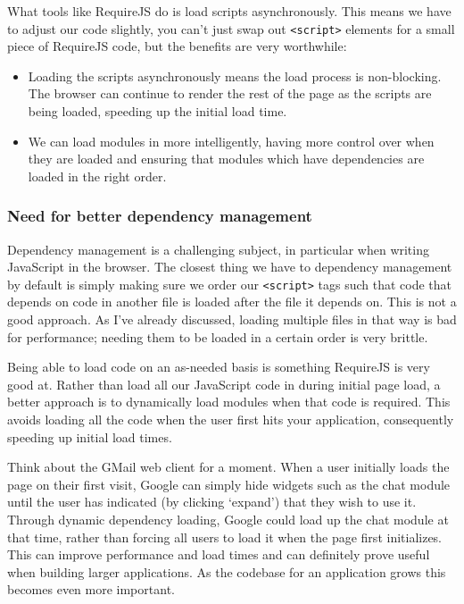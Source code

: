 \documentclass[9pt]{book}
\begin{document}
What tools like RequireJS do is load scripts asynchronously. This means
we have to adjust our code slightly, you can't just swap out
\texttt{\textless{}script\textgreater{}} elements for a small piece of
RequireJS code, but the benefits are very worthwhile:

\begin{itemize}
\itemsep1pt\parskip0pt
\item
  Loading the scripts asynchronously means the load process is
  non-blocking. The browser can continue to render the rest of the page
  as the scripts are being loaded, speeding up the initial load time.
\item
  We can load modules in more intelligently, having more control over
  when they are loaded and ensuring that modules which have dependencies
  are loaded in the right order.
\end{itemize}

\subsubsection{Need for better dependency
management}\label{need-for-better-dependency-management}

Dependency management is a challenging subject, in particular when
writing JavaScript in the browser. The closest thing we have to
dependency management by default is simply making sure we order our
\texttt{\textless{}script\textgreater{}} tags such that code that
depends on code in another file is loaded after the file it depends on.
This is not a good approach. As I've already discussed, loading multiple
files in that way is bad for performance; needing them to be loaded in a
certain order is very brittle.

Being able to load code on an as-needed basis is something RequireJS is
very good at. Rather than load all our JavaScript code in during initial
page load, a better approach is to dynamically load modules when that
code is required. This avoids loading all the code when the user first
hits your application, consequently speeding up initial load times.

Think about the GMail web client for a moment. When a user initially
loads the page on their first visit, Google can simply hide widgets such
as the chat module until the user has indicated (by clicking `expand')
that they wish to use it. Through dynamic dependency loading, Google
could load up the chat module at that time, rather than forcing all
users to load it when the page first initializes. This can improve
performance and load times and can definitely prove useful when building
larger applications. As the codebase for an application grows this
becomes even more important.
\end{document}
